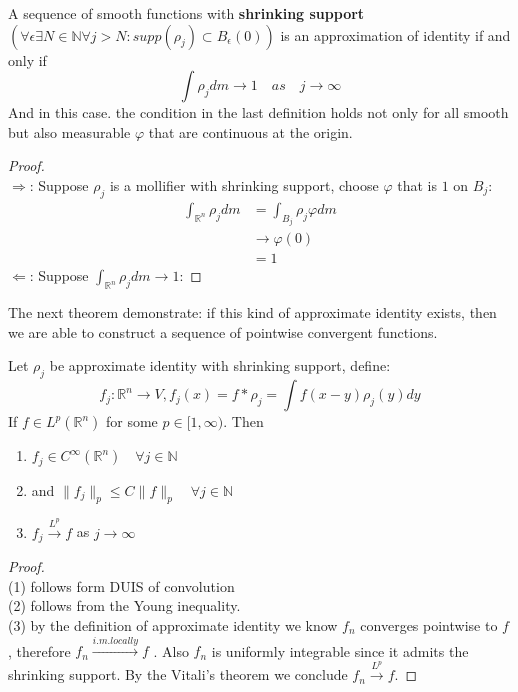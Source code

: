 \begin{lemma}
	A sequence of smooth functions with \textbf{shrinking support}$ (\forall \epsilon \exists N \in \mathbb{N} \forall j > N: supp(\rho_j) \subset B_\epsilon(0))$ is an approximation of identity if and only if
	\begin{equation*}
		\int \rho_j dm \rightarrow 1 \quad as \quad j \rightarrow \infty
	\end{equation*}
	And in this case. the condition in the last definition holds not only for all smooth but also measurable $\varphi$ that are continuous at the origin.
\end{lemma}
\begin{proof}\quad\\
$\Rightarrow$: Suppose $\rho_j$ is a mollifier with shrinking support, choose $\varphi$ that is $1$ on $B_j$:
\begin{align*}
	\int_{\mathbb{R}^n} \rho_j dm &= \int_{B_j} \rho_j \varphi dm\\
	&\rightarrow \varphi(0) \\
	&= 1
\end{align*}
$\Leftarrow$: Suppose $\int_{\mathbb{R}^n} \rho_j dm \rightarrow 1$:
	
\end{proof}

The next theorem demonstrate: if this kind of approximate identity exists, then we are able to construct a sequence of pointwise convergent functions.

\begin{theorem}
	Let $\rho_j$ be approximate identity with shrinking support,  define:
	\begin{equation*}
		f_j: \mathbb{R}^n \rightarrow V, f_j(x) = f * \rho_j = \int f(x-y)\rho_j(y) dy
	\end{equation*}
	If $f \in L^p(\mathbb{R}^n)$ for some $p \in [1, \infty)$. Then 
	\begin{enumerate}
		\item $f_j \in C^\infty (\mathbb{R}^n) \quad \forall j \in \mathbb{N}$ 
		\item and $\|f_j\|_p \leq C \|f\|_p \quad \forall j \in \mathbb{N} $
		\item  $f_j \overset{L^p}{\rightarrow} f$ as $j \rightarrow \infty$ 
	\end{enumerate}
\end{theorem}
\begin{proof}\quad\\
(1) follows form DUIS of convolution \\
(2) follows from the Young inequality.\\ 
(3) by the definition of approximate identity we know $f_n$ converges pointwise to $f$, therefore $f_n \overset{i.m. locally}{\longrightarrow}f$ . Also $f_n$ is uniformly integrable since it admits the shrinking support. By the Vitali's theorem we conclude $f_n \overset{L^p}{\longrightarrow} f$.
\end{proof}



